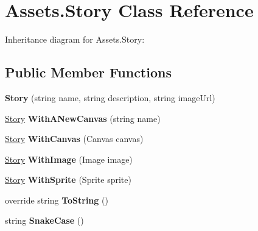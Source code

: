 \hypertarget{classAssets_1_1Story}{}\section{Assets.\+Story Class Reference}
\label{classAssets_1_1Story}


Inheritance diagram for Assets.\+Story\+:
\subsection*{Public Member Functions}
\begin{DoxyCompactItemize}
\item 
{\bfseries Story} (string name, string description, string image\+Url)\hypertarget{classAssets_1_1Story_a4d7339fc9bf96a8d66ad51c85a6964c0}{}\label{classAssets_1_1Story_a4d7339fc9bf96a8d66ad51c85a6964c0}

\item 
\hyperlink{classAssets_1_1Story}{Story} {\bfseries With\+A\+New\+Canvas} (string name)\hypertarget{classAssets_1_1Story_ab568545f632d2622f0db6d936eeb3041}{}\label{classAssets_1_1Story_ab568545f632d2622f0db6d936eeb3041}

\item 
\hyperlink{classAssets_1_1Story}{Story} {\bfseries With\+Canvas} (Canvas canvas)\hypertarget{classAssets_1_1Story_ae11de035f364482380fae49ec694a581}{}\label{classAssets_1_1Story_ae11de035f364482380fae49ec694a581}

\item 
\hyperlink{classAssets_1_1Story}{Story} {\bfseries With\+Image} (Image image)\hypertarget{classAssets_1_1Story_af5ed3cfc26739f4436e89edd7680425b}{}\label{classAssets_1_1Story_af5ed3cfc26739f4436e89edd7680425b}

\item 
\hyperlink{classAssets_1_1Story}{Story} {\bfseries With\+Sprite} (Sprite sprite)\hypertarget{classAssets_1_1Story_a8c8c65695dc420910b664859f3589553}{}\label{classAssets_1_1Story_a8c8c65695dc420910b664859f3589553}

\item 
override string {\bfseries To\+String} ()\hypertarget{classAssets_1_1Story_a0212b5b9fee3928f640b720dcfc6e271}{}\label{classAssets_1_1Story_a0212b5b9fee3928f640b720dcfc6e271}

\item 
string {\bfseries Snake\+Case} ()\hypertarget{classAssets_1_1Story_a0dff94a5cd81eced8007dd78f5d7e904}{}\label{classAssets_1_1Story_a0dff94a5cd81eced8007dd78f5d7e904}

\end{DoxyCompactItemize}
